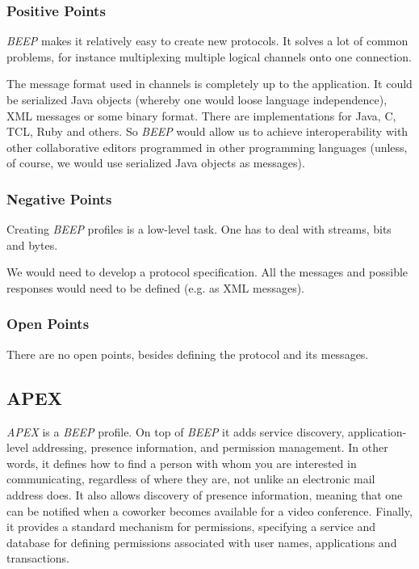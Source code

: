 \subsubsection{Positive Points}
\emph{BEEP} makes it relatively easy to create new protocols. It solves a lot of common problems, for instance multiplexing multiple logical channels onto one connection.

The message format used in channels is completely up to the application. It could be serialized Java objects (whereby one would loose language independence), XML messages or some binary format. There are implementations for Java, C, TCL, Ruby and others. So \emph{BEEP} would allow us to achieve interoperability with other collaborative editors programmed in other programming languages (unless, of course, we would use serialized Java objects as messages).

\subsubsection{Negative Points}
Creating \emph{BEEP} profiles is a low-level task. One has to deal with streams, bits and bytes. 

We would need to develop a protocol specification. All the messages and possible responses would need to be defined (e.g. as XML messages).

\subsubsection{Open Points}
There are no open points, besides defining the protocol and its messages.



\subsection{APEX} 
\emph{APEX} is a \emph{BEEP} profile. On top of \emph{BEEP} it adds service discovery, application-level addressing, presence information, and permission management. In other words, it defines how to find a person with whom you are interested in communicating, regardless of where they are, not unlike an electronic mail address does. It also allows discovery of presence information, meaning that one can be notified when a coworker becomes available for a video conference. Finally, it provides a standard mechanism for permissions, specifying a service and database for defining permissions associated with user names, applications and transactions.


